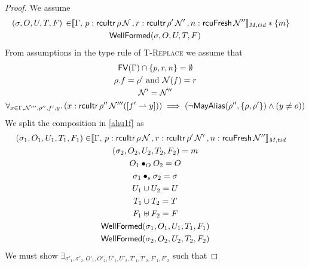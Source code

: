  \begin{proof}
 We assume
\begin{gather}\label{ahu1f}
  \begin{aligned}
    (\sigma, O, U, T,F) \, \in &  \llbracket \Gamma,\,
 p:\textsf{rcuItr}\, \rho \, \mathcal{N} \, ,
  r:\textsf{rcuItr}\, \rho' \, \mathcal{N}' \, , n:\textsf{rcuFresh} \, \mathcal{N}'' \rrbracket_{M,tid} * \{m\}
    \end{aligned} \\
\textsf{WellFormed}(\sigma,O,U,T,F)
\label{ahu2f}
\end{gather}
From assumptions in the type rule of \textsc{T-Replace} we assume that
\begin{gather}
\textsf{FV}(\Gamma) \cap \{p,r,n\}  =\emptyset 
  \label{ahu3f} \\
\rho.f  = \rho' \text{ and } \mathcal{N}(f) = r
    \label{ahu4f} \\
\mathcal{N}' = \mathcal{N}''
\label{ahu5f} \\
\begin{aligned}
\forall_{x \in \Gamma, \mathcal{N}''', \rho'',f',y} \ldotp (x:\textsf{rcuItr}\,\rho''\,\mathcal{N}'''([f'\rightharpoonup y])) \implies (\neg\mathsf{MayAlias}(\rho'',\{\rho,\rho'\}) \land (y\neq o  ))  
\label{ahu6f}
  \end{aligned}
\end{gather}
We split the composition in  \ref{ahu1f} as 
\begin{gather} \label{ahu11f}
  \begin{aligned}
    (\sigma_1, O_{1}, U_{1}, T_{1} ,F_1) \in & \llbracket \Gamma,\,
 p:\textsf{rcuItr}\, \rho \, \mathcal{N} \, ,
  r:\textsf{rcuItr}\, \rho' \, \mathcal{N}' \, , n:\textsf{rcuFresh} \, \mathcal{N}'' \rrbracket_{M,tid} \end{aligned}\\
\label{ahu12f}
(\sigma_2, O_{2}, U_{2}, T_{2},F_2) = m
\\
\label{ahu13f}
O_{1} \bullet_{O} O_{2} = O
\\
\label{ahusigf}
\sigma_1 \bullet_s \sigma_2 = \sigma \\
\label{ahu14f}
U_{1} \cup U_{2} = U
\\
\label{ahu15f}
T_{1} \cup T_{2} = T
\\
\label{ahufff}
F_1 \uplus F_2 = F
\\
\label{ahu16f}
\textsf{WellFormed}(\sigma_1,O_{1},U_{1},T_{1},F_1)
\\
\label{ahu17f}
\textsf{WellFormed}(\sigma_2,O_{2},U_{2},T_{2},F_2)
\end{gather}
We must show $\exists_{\sigma'_1, \sigma'_2, O'_{1}, O'_{2}, U'_{1}, U'_{2}, T'_{1}, T'_{2}, F'_1, F'_2}$ such that

\end{proof}
